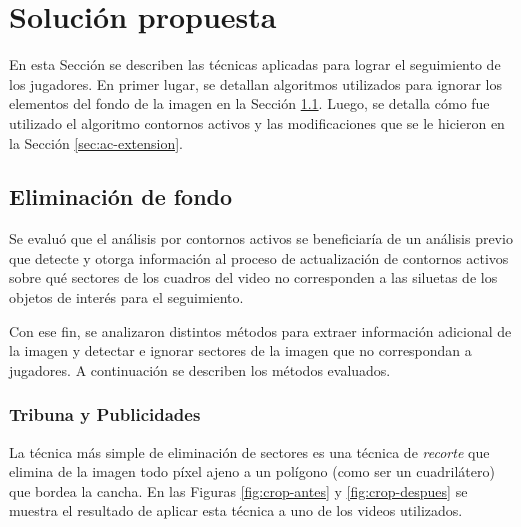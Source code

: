 \chapter{Solución propuesta}
\label{chap-solution}

En esta Sección se describen las técnicas aplicadas para lograr el seguimiento
de los jugadores. En primer lugar, se detallan algoritmos utilizados para
ignorar los elementos del fondo de la imagen en la Sección
\ref{sec:background-elimination}. Luego, se detalla cómo fue utilizado el
algoritmo contornos activos y las modificaciones que se le hicieron en la
Sección \ref{sec:ac-extension}.

\section{Eliminación de fondo}

\label{sec:background-elimination}
Se evaluó que el análisis por contornos activos se beneficiaría de un análisis
previo que detecte y otorga información al proceso de actualización de
contornos activos sobre qué sectores de los cuadros del video no corresponden a
las siluetas de los objetos de interés para el seguimiento.

Con ese fin, se analizaron distintos métodos para extraer información adicional
de la imagen y detectar e ignorar sectores de la imagen que no correspondan a
jugadores. A continuación se describen los métodos evaluados.

\subsection{Tribuna y Publicidades}
\label{subsec:crop-tribunas}

La técnica más simple de eliminación de sectores es una técnica de
\textit{recorte} que elimina de la imagen todo píxel ajeno a un polígono
(como ser un cuadrilátero) que bordea la cancha. En las Figuras
\ref{fig:crop-antes} y \ref{fig:crop-despues} se muestra el resultado de
aplicar esta técnica a uno de los videos utilizados.

